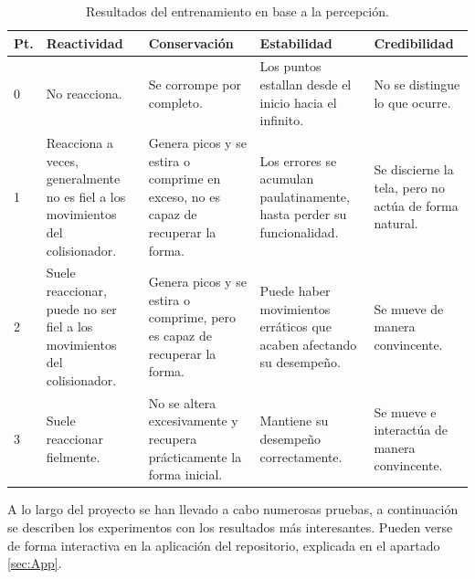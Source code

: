   \begin{table}[H]
    \begin{center}
        \begin{tabular}{ | m{0.6cm} |  m{3cm} | m{3cm} | m{3cm} | m{3cm} |}
        \hline \textbf{Pt.} & \textbf{Reactividad} & \textbf{Conservación} & \textbf{Estabilidad} & \textbf{Credibilidad} \\ \hline
            0 
            & No reacciona. 
            & Se corrompe por completo.
            & Los puntos estallan desde el inicio hacia el infinito.
            & No se distingue lo que ocurre.
            \\ \hline            
            1 
            & Reacciona a veces, generalmente no es fiel a los movimientos del colisionador. 
            & Genera picos y se estira o comprime en exceso, no es capaz de recuperar la forma.
            & Los errores se acumulan paulatinamente, hasta perder su funcionalidad.
            & Se discierne la tela, pero no actúa de forma natural.
            \\ \hline
            2 
            & Suele reaccionar, puede no ser fiel a los movimientos del colisionador. 
            & Genera picos y se estira o comprime, pero es capaz de recuperar la forma.
            & Puede haber movimientos erráticos que acaben afectando su desempeño. 
            & Se mueve de manera convincente.
            \\ \hline
            3 
            & Suele reaccionar fielmente. 
            & No se altera excesivamente y recupera prácticamente la forma inicial.
            & Mantiene su desempeño correctamente. 
            & Se mueve e interactúa de manera convincente.
            \\ \hline
        \end{tabular}
    \end{center}
    \caption{Resultados del entrenamiento en base a la percepción.}
    \label{tab:rubrica}
    \end{table}

    
A lo largo del proyecto se han llevado a cabo numerosas pruebas, a continuación se describen los experimentos con los resultados más interesantes. Pueden verse de forma interactiva en la aplicación del repositorio, explicada en el apartado \ref{sec:App}.

